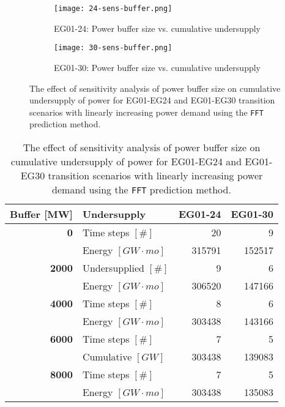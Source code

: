 \begin{figure}[]
	\centering
	\begin{subfigure}[t]{\textwidth}
		\centering
		\texttt{[image: 24-sens-buffer.png]} 
		\caption{EG01-24: Power buffer size vs. cumulative undersupply}
		\label{fig:eg24-bufplot}
	\end{subfigure}
	\begin{subfigure}[t]{\textwidth}
		\centering
		\texttt{[image: 30-sens-buffer.png]} 
		\caption{EG01-30: Power buffer size vs. cumulative undersupply}
		\label{fig:eg30-bufplot}
	\end{subfigure}
	\hfill
	\caption{The effect of sensitivity analysis of power buffer size on cumulative 
	undersupply of power for EG01-EG24 and EG01-EG30 transition scenarios 
	with linearly increasing power demand using the \texttt{FFT} prediction method.}
	\label{fig:sabuffer}
\end{figure}

\begin{table}[]
	\centering
	\caption{The effect of sensitivity analysis of power buffer size on cumulative 
	undersupply of power for EG01-EG24 and EG01-EG30 transition scenarios with linearly 
	increasing power demand using the \texttt{FFT} prediction method.}
	\label{tab:buff_size}
	\footnotesize
		\begin{tabular}{r|lrr}
                \hline
        \textbf{Buffer [MW]}     & \textbf{Undersupply}             & \textbf{EG01-24}   & \textbf{EG01-30} \\
		\hline
		\textbf{0}             & Time steps $[\#]$ & 20 & 9\\  
                      & Energy $[GW\cdot mo]$    & 315791 & 152517 \\ \hline
		\textbf{2000}          & Undersupplied $[\#]$ & 9 & 6 \\  
        	      & Energy $[GW\cdot mo]$    & 306520 & 147166 \\ \hline
        \textbf{4000}          & Time steps $[\#]$ & 8 & 6 \\  
				  & Energy $[GW\cdot mo]$    & 303438 & 143166 \\ \hline
		\textbf{6000}          & Time steps $[\#]$ & 7 & 5 \\  
		& Cumulative $[GW]$    & 303438 & 139083 \\ \hline
        \textbf{8000}          & Time steps $[\#]$ & 7 & 5  \\  
	              & Energy $[GW\cdot mo]$    & 303438 & 135083 \\ \hline
	\end{tabular}
\end{table}

